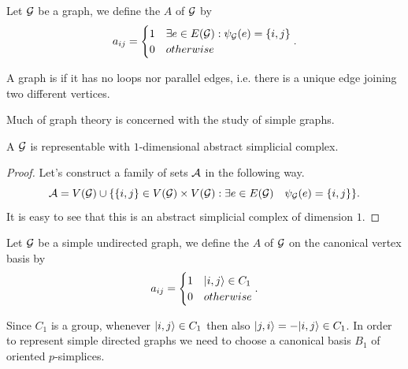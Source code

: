 \documentclass[../2.tex]{subfiles}
\begin{document}
    \begin{defn}
        Let $\mathcal{G}$ be a graph, we define the  $A$ of $\mathcal{G}$ by
        \[a_{ij} = 
        \begin{cases}
            1 & \exists e \in E(\mathcal{G}) : \psi_{\mathcal{G}}(e) = \{i,j\} \\
            0 & otherwise \\
        \end{cases}. \]        
    \end{defn}

    \begin{defn}
        A graph is  if it has no loops nor parallel edges, i.e. there is a unique edge joining two different vertices.
    \end{defn}
    
    Much of graph theory is concerned with the study of simple graphs.

    \begin{prop}
        A  $\mathcal{G}$ is representable with $1$-dimensional abstract simplicial complex.
    \end{prop}
    \begin{proof}
        Let's construct a family of sets $\mathcal{A}$ in the following way.
        \[ \mathcal{A} = V(\mathcal{G}) \cup \{ \{i,j\} \in V(\mathcal{G}) \times V(\mathcal{G}) : \exists e \in E(\mathcal{G}) \quad \psi_{\mathcal{G}}(e)=\{i,j\}\}. \]
        It is easy to see that this is an abstract simplicial complex of dimension $1$.
    \end{proof}


    \begin{defn}
        Let $\mathcal{G}$ be a simple undirected graph, we define the  $A$ of $\mathcal{G}$ on the canonical vertex basis by
        \[a_{ij} = 
        \begin{cases}
            1 & | i,j \rangle \in C_1 \\
            0 & otherwise \\
        \end{cases}. \]        
    \end{defn}

    Since $C_1$ is a group, whenever $| i,j \rangle \in C_1$ then also $| j,i \rangle = -| i,j \rangle \in C_1$. In order to represent simple directed
    graphs we need to choose a canonical basis $B_1$ of oriented $p$-simplices.
\end{document}
